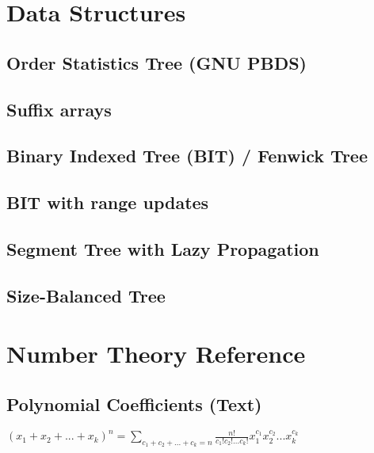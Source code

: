 \documentclass[9pt]{extarticle}
\begin{document}
\begin{multicols*}{3}
\section{Data Structures}

\subsection{Order Statistics Tree (GNU PBDS)} %


\subsection{Suffix arrays} %


\subsection{Binary Indexed Tree (BIT) / Fenwick Tree} %


\subsection{BIT with range updates} %


\subsection{Segment Tree with Lazy Propagation} %


\subsection{Size-Balanced Tree}


\section{Number Theory Reference}
\subsection{Polynomial Coefficients (Text)} %
$(x_1 + x_2 + ... + x_k)^n = \sum_{c_1 + c_2 + ... + c_k = n}
\frac{n!}{c_1! c_2! ... c_k!} x_1^{c_1} x_2^{c_2} ... x_k^{c_k}$


\end{multicols*}
\end{document}
